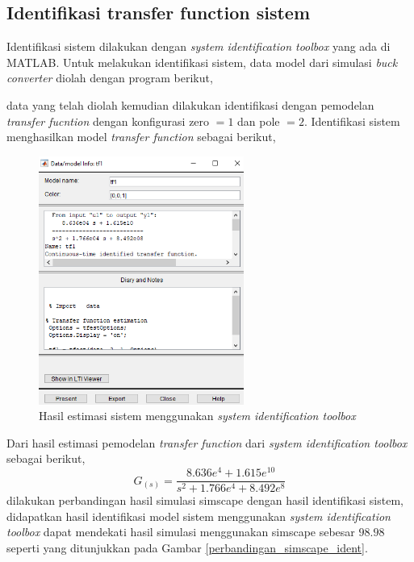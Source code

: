\documentclass[../main.tex]{subfiles}
\begin{document}
        \subsection{Identifikasi transfer function sistem}
            Identifikasi sistem dilakukan dengan \textit{system identification toolbox} yang ada di MATLAB. Untuk melakukan identifikasi sistem, data model dari simulasi \textit{buck converter} diolah dengan program berikut,
            
            data yang telah diolah kemudian dilakukan identifikasi dengan pemodelan \textit{transfer fucntion} dengan konfigurasi zero $ = 1$ dan pole $ = 2$. Identifikasi sistem menghasilkan model \textit{transfer function} sebagai berikut,
            \begin{figure}[H]
                \centering
                \includegraphics[width = 0.6\textwidth]{assets/image/HASIL_ESTIMASI_MODEL.png}
                \caption{Hasil estimasi sistem menggunakan \textit{system identification toolbox}}
                \label{estimasi_sistem}
            \end{figure}
            Dari hasil estimasi pemodelan \textit{transfer function} dari \textit{system identification toolbox} sebagai berikut,
            \begin{equation}
                G_{(s)} = \frac{8.636e^{4} + 1.615e^{10}}{s^2 + 1.766e^4 + 8.492e^8}
                \label{persamaan_1}
            \end{equation}
            dilakukan perbandingan hasil simulasi simscape dengan hasil identifikasi sistem, didapatkan hasil identifikasi model sistem menggunakan \textit{system identification toolbox} dapat mendekati hasil simulasi menggunakan simscape sebesar $98.98$ seperti yang ditunjukkan pada Gambar \ref{perbandingan_simscape_ident}.
\end{document}
